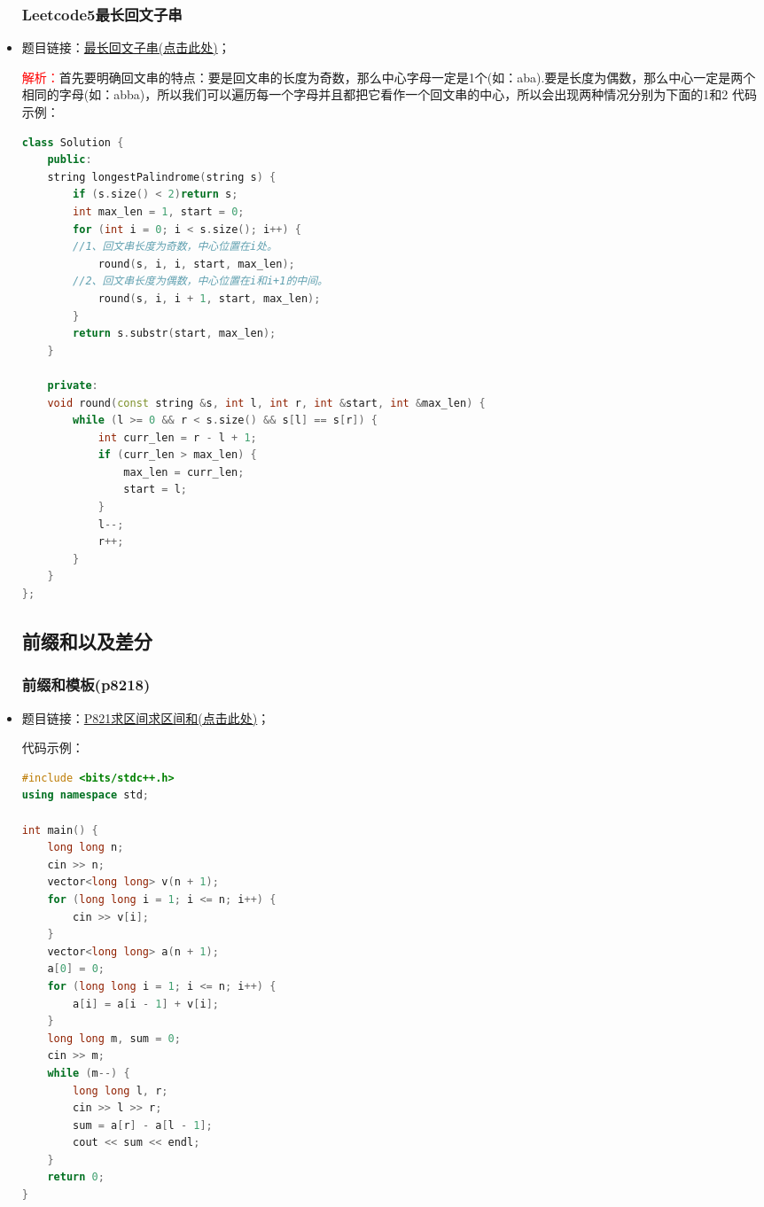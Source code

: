 \begin{itemize}
\subsubsection{Leetcode5最长回文子串}
\item 题目链接：\href{https://leetcode.cn/problems/longest-palindromic-substring/}{最长回文子串(点击此处)}；

\textcolor{red}{解析：}首先要明确回文串的特点：要是回文串的长度为奇数，那么中心字母一定是1个(如：aba).要是长度为偶数，那么中心一定是两个相同的字母(如：abba)，所以我们可以遍历每一个字母并且都把它看作一个回文串的中心，所以会出现两种情况分别为下面的1和2
代码示例：\\
\begin{lstlisting}[language=C++]
class Solution {
	public:
	string longestPalindrome(string s) {
		if (s.size() < 2)return s;
		int max_len = 1, start = 0;
		for (int i = 0; i < s.size(); i++) {
		//1、回文串长度为奇数，中心位置在i处。
   	   		round(s, i, i, start, max_len);
   	   	//2、回文串长度为偶数，中心位置在i和i+1的中间。
  	   		round(s, i, i + 1, start, max_len);
		}
		return s.substr(start, max_len);
	}
	
	private:
	void round(const string &s, int l, int r, int &start, int &max_len) {
		while (l >= 0 && r < s.size() && s[l] == s[r]) {
			int curr_len = r - l + 1;
			if (curr_len > max_len) {
				max_len = curr_len;
				start = l;
			}
			l--;
			r++;
		}
	}
};
\end{lstlisting}
\subsection{前缀和以及差分}
\subsubsection{前缀和模板(p8218)}
\item 题目链接：\href{https://www.luogu.com.cn/problem/P8218}{P821求区间求区间和(点击此处)}；

代码示例：\\
\begin{lstlisting}[language=C++]
#include <bits/stdc++.h>
using namespace std;

int main() {
	long long n;
	cin >> n;
	vector<long long> v(n + 1);
	for (long long i = 1; i <= n; i++) {
		cin >> v[i];
	}
	vector<long long> a(n + 1);
	a[0] = 0;
	for (long long i = 1; i <= n; i++) {
		a[i] = a[i - 1] + v[i];
	}
	long long m, sum = 0;
	cin >> m;
	while (m--) {
		long long l, r;
		cin >> l >> r;
		sum = a[r] - a[l - 1];
		cout << sum << endl;
	}
	return 0;
}
\end{lstlisting}

\end{itemize}
